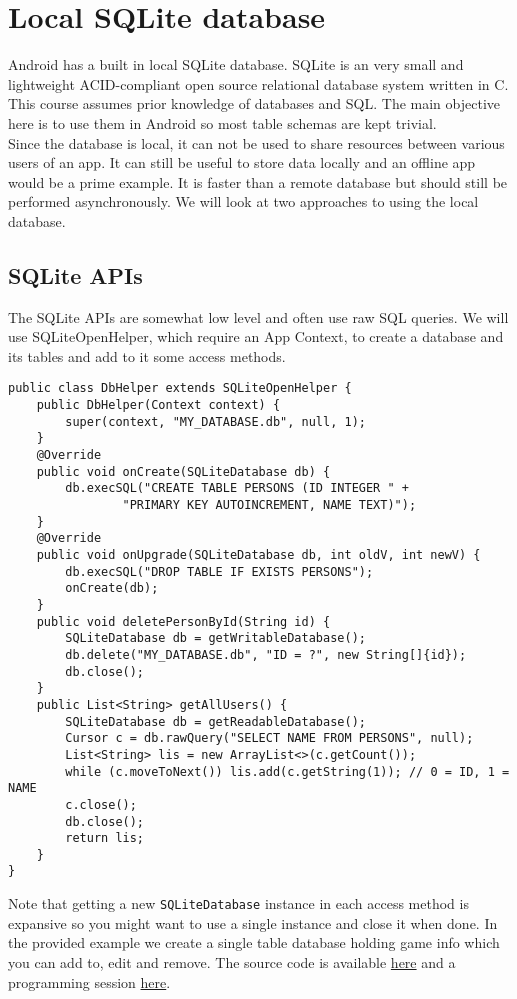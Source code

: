 \section{Local SQLite database}
Android has a built in local SQLite database. SQLite is an very small and lightweight ACID-compliant open source relational database system written in C. This course assumes prior knowledge of databases and SQL. The main objective here is to use them in Android so most table schemas are kept trivial.\\

Since the database is local, it can not be used to share resources between various users of an app. It can still be useful to store data locally and an offline app would be a prime example. It is faster than a remote database but should still be performed asynchronously. We will look at two approaches to using the local database. 

\subsection{SQLite APIs}
The SQLite APIs are somewhat low level and often use raw SQL queries. We will use SQLiteOpenHelper, which require an App Context, to create a database and its tables and add to it some access methods.

\begin{lstlisting}[style=A_Java]
public class DbHelper extends SQLiteOpenHelper {
    public DbHelper(Context context) {
        super(context, "MY_DATABASE.db", null, 1);
    }
    @Override
    public void onCreate(SQLiteDatabase db) {
        db.execSQL("CREATE TABLE PERSONS (ID INTEGER " +
                "PRIMARY KEY AUTOINCREMENT, NAME TEXT)");
    }
    @Override
    public void onUpgrade(SQLiteDatabase db, int oldV, int newV) {
        db.execSQL("DROP TABLE IF EXISTS PERSONS");
        onCreate(db);
    }
    public void deletePersonById(String id) {
        SQLiteDatabase db = getWritableDatabase();
        db.delete("MY_DATABASE.db", "ID = ?", new String[]{id});
        db.close();
    }
    public List<String> getAllUsers() {
        SQLiteDatabase db = getReadableDatabase();
        Cursor c = db.rawQuery("SELECT NAME FROM PERSONS", null);
        List<String> lis = new ArrayList<>(c.getCount());
        while (c.moveToNext()) lis.add(c.getString(1)); // 0 = ID, 1 = NAME
        c.close();
        db.close();
        return lis;
    }
}
\end{lstlisting}
Note that getting a new \texttt{SQLiteDatabase} instance in each access method is expansive so you might want to use a single instance and close it when done. In the provided example we create a single table database holding game info which you can add to, edit and remove. The source code is available \href{https://github.com/JonSteinn/AndroidDevelopment/tree/master/examples/lab5/gamesdb}{here} and a programming session \href{https://www.youtube.com/watch?v=miwDjfKtd7o}{here}.

